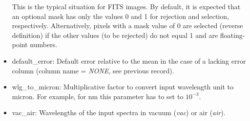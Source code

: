\begin{itemize}
This is the typical situation for \ac{FITS} images. By default, it is expected
that an optional mask has only the values 0 and 1 for rejection and selection,
respectively. Alternatively, pixels with a mask value of 0 are selected
(reverse definition) if the other values (to be rejected) do not equal 1 and
are floating-point numbers.
\item {\sc default\_error}: Default error relative to the mean in the case of
a lacking error column (column name = {\it NONE}, see previous record).
\item {\sc wlg\_to\_micron}: Multiplicative factor to convert input wavelength
unit to micron. For example, for nm this parameter has to set to $10^{-3}$.
\item {\sc vac\_air}: Wavelengths of the input spectra in vacuum ({\it vac}) or
air ({\it air}).
\end{itemize}

